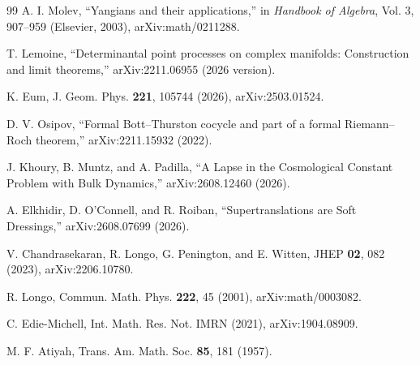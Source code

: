 \documentclass[aps,prd,preprint,nofootinbib,superscriptaddress]{revtex4-2}
\theoremstyle{definition}
\theoremstyle{remark}
\begin{document}
\begin{thebibliography}{99}
A. I. Molev,
``Yangians and their applications,''
in \emph{Handbook of Algebra}, Vol. 3, 907--959 (Elsevier, 2003),
arXiv:math/0211288.

T. Lemoine,
``Determinantal point processes on complex manifolds: Construction and limit
theorems,'' arXiv:2211.06955 (2026 version).

K. Eum,
J. Geom. Phys. \textbf{221}, 105744 (2026), arXiv:2503.01524.

D. V. Osipov,
``Formal Bott--Thurston cocycle and part of a formal Riemann--Roch theorem,''
arXiv:2211.15932 (2022).

J. Khoury, B. Muntz, and A. Padilla,
``A Lapse in the Cosmological Constant Problem with Bulk Dynamics,''
arXiv:2608.12460 (2026).

A. Elkhidir, D. O'Connell, and R. Roiban,
``Supertranslations are Soft Dressings,''
arXiv:2608.07699 (2026).

V. Chandrasekaran, R. Longo, G. Penington, and E. Witten,
JHEP \textbf{02}, 082 (2023), arXiv:2206.10780.

R. Longo,
Commun. Math. Phys. \textbf{222}, 45 (2001), arXiv:math/0003082.

C. Edie-Michell,
Int. Math. Res. Not. IMRN (2021), arXiv:1904.08909.

M. F. Atiyah,
Trans. Am. Math. Soc. \textbf{85}, 181 (1957).

\end{thebibliography}
\end{document}
